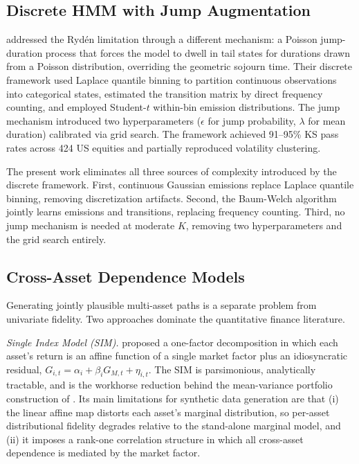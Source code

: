 \subsection{Discrete HMM with Jump Augmentation}

\citet{alswaidan2026hybrid} addressed the Ryd\'{e}n limitation through a different mechanism: a Poisson jump-duration process that forces the model to dwell in tail states for durations drawn from a Poisson distribution, overriding the geometric sojourn time.
Their discrete framework used Laplace quantile binning to partition continuous observations into categorical states, estimated the transition matrix by direct frequency counting, and employed Student-$t$ within-bin emission distributions.
The jump mechanism introduced two hyperparameters ($\epsilon$ for jump probability, $\lambda$ for mean duration) calibrated via grid search.
The framework achieved 91--95\% KS pass rates across 424 US equities and partially reproduced volatility clustering.

The present work eliminates all three sources of complexity introduced by the discrete framework.
First, continuous Gaussian emissions replace Laplace quantile binning, removing discretization artifacts.
Second, the Baum-Welch algorithm jointly learns emissions and transitions, replacing frequency counting.
Third, no jump mechanism is needed at moderate $K$, removing two hyperparameters and the grid search entirely.

\subsection{Cross-Asset Dependence Models}
\label{sec:related_dep}

Generating jointly plausible multi-asset paths is a separate problem from univariate fidelity.
Two approaches dominate the quantitative finance literature.

\textit{Single Index Model (SIM).}
\citet{sharpe1963simplified} proposed a one-factor decomposition in which each asset's return is an affine function of a single market factor plus an idiosyncratic residual, $G_{i,t} = \alpha_i + \beta_i G_{M,t} + \eta_{i,t}$.
The SIM is parsimonious, analytically tractable, and is the workhorse reduction behind the mean-variance portfolio construction of \citet{markowitz1952portfolio}.
Its main limitations for synthetic data generation are that (i) the linear affine map distorts each asset's marginal distribution, so per-asset distributional fidelity degrades relative to the stand-alone marginal model, and (ii) it imposes a rank-one correlation structure in which all cross-asset dependence is mediated by the market factor.

